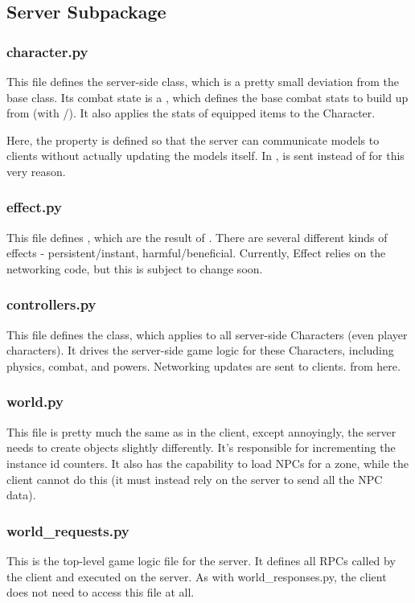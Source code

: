 \documentclass{article}
\begin{document}
\subsection{Server Subpackage}
\subsubsection{character.py}
This file defines the server-side  class, which is a pretty small deviation from
the base  class. Its combat state is a , which
defines the base combat stats to build up from (with /). It also
applies the stats of equipped items to the Character.

Here, the property  is defined so that the server can communicate models
to clients without actually updating the models itself. In ,
 is sent instead of  for this very reason.
\subsubsection{effect.py}
This file defines , which are the result of .
There are several different kinds of effects - persistent/instant, harmful/beneficial.
Currently, Effect relies on the networking code, but this is subject to change soon.
\subsubsection{controllers.py}
This file defines the  class, which applies to all server-side
Characters (even player characters). It drives the server-side game logic for these
Characters, including physics, combat, and powers. Networking updates are sent to clients.
from here.
\subsubsection{world.py}
This file is pretty much the same as in the client, except annoyingly, the server needs to
create objects slightly differently. It's responsible for incrementing the instance id
counters. It also has the capability to load NPCs for a zone, while the client cannot
do this (it must instead rely on the server to send all the NPC data).
\subsubsection{world\_requests.py}
This is the top-level game logic file for the server. It defines all RPCs called by
the client and executed on the server. As with world\_responses.py, the client does not
need to access this file at all.
\end{document}
